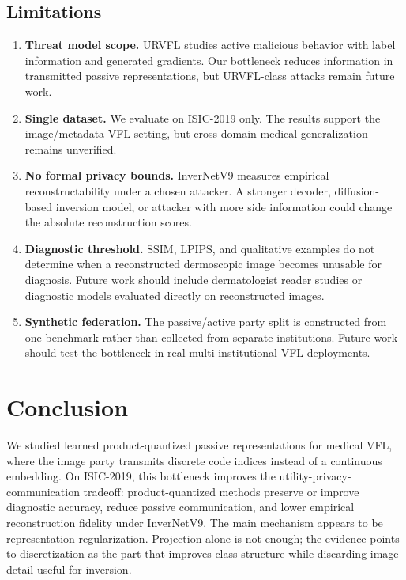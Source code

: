 \documentclass{article}
\begin{document}
\subsection{Limitations}

\begin{enumerate}
    \item \textbf{Threat model scope.} URVFL \citep{yao2025urvfl} studies active malicious behavior with label information and generated gradients. Our bottleneck reduces information in transmitted passive representations, but URVFL-class attacks remain future work.
    \item \textbf{Single dataset.} We evaluate on ISIC-2019 only. The results support the image/metadata VFL setting, but cross-domain medical generalization remains unverified.
    \item \textbf{No formal privacy bounds.} InverNetV9 measures empirical reconstructability under a chosen attacker. A stronger decoder, diffusion-based inversion model, or attacker with more side information could change the absolute reconstruction scores.
    \item \textbf{Diagnostic threshold.} SSIM, LPIPS, and qualitative examples do not determine when a reconstructed dermoscopic image becomes unusable for diagnosis. Future work should include dermatologist reader studies or diagnostic models evaluated directly on reconstructed images.
    \item \textbf{Synthetic federation.} The passive/active party split is constructed from one benchmark rather than collected from separate institutions. Future work should test the bottleneck in real multi-institutional VFL deployments.
\end{enumerate}

\section{Conclusion}
We studied learned product-quantized passive representations for medical VFL, where the image party transmits discrete code indices instead of a continuous embedding. On ISIC-2019, this bottleneck improves the utility-privacy-communication tradeoff: product-quantized methods preserve or improve diagnostic accuracy, reduce passive communication, and lower empirical reconstruction fidelity under InverNetV9. The main mechanism appears to be representation regularization. Projection alone is not enough; the evidence points to discretization as the part that improves class structure while discarding image detail useful for inversion.
\end{document}
